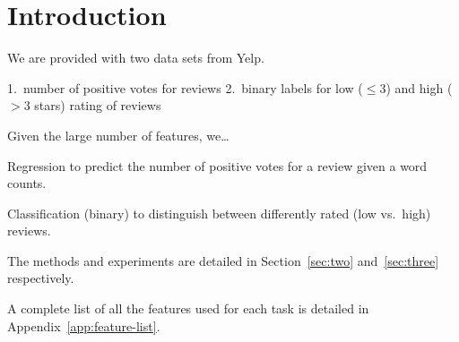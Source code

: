 \section{Introduction}
\label{sec:one}

We are provided with two data sets from
Yelp.

1.\ number of positive votes for reviews
2.\ binary labels for low ($\leq 3$) and high ($>3$ stars) rating of reviews

Given the large number of features, we\ldots

Regression to predict the number of positive votes for a review given a word
counts.

Classification (binary) to distinguish between differently rated (low vs.\ high)
reviews.

The methods and experiments are detailed in Section~\ref{sec:two}
and~\ref{sec:three} respectively.

A complete list of all the features used for each task is
detailed in Appendix~\ref{app:feature-list}.

